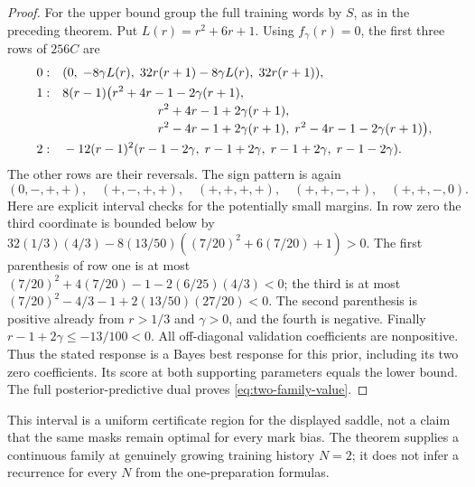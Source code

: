 \begin{proof}
For the upper bound group the full training words by $S$, as in the
preceding theorem. Put $L(r)=r^2+6r+1$. Using $f_\gamma(r)=0$, the first
three rows of $256C$ are
\begin{align*}
 0:&\quad (0,\;-8\gamma L(r),\;32r(r+1)-8\gamma L(r),\;32r(r+1)),\\
 1:&\quad 8(r-1)\bigl(r^2+4r-1-2\gamma(r+1),\bigr.\\[-2pt]
   &\hspace{30mm}r^2+4r-1+2\gamma(r+1),\\[-2pt]
   &\hspace{30mm}\bigl.r^2-4r-1+2\gamma(r+1),\;
                       r^2-4r-1-2\gamma(r+1)\bigr),\\
 2:&\quad-12(r-1)^2(r-1-2\gamma,\;r-1+2\gamma,\;
                                     r-1+2\gamma,\;r-1-2\gamma).
\end{align*}
The other rows are their reversals. The sign pattern is again
\[
 (0,-,+,+),\quad(+,-,+,+),\quad(+,+,+,+),\quad
 (+,+,-,+),\quad(+,+,-,0).
\]
Here are explicit interval checks for the potentially small margins.
In row zero the third coordinate is bounded below by
$32(1/3)(4/3)-8(13/50)((7/20)^2+6(7/20)+1)>0$.
The first parenthesis of row one is at most
$(7/20)^2+4(7/20)-1-2(6/25)(4/3)<0$; the third is at most
$(7/20)^2-4/3-1+2(13/50)(27/20)<0$.
The second parenthesis is positive already from $r>1/3$ and $\gamma>0$,
and the fourth is negative. Finally $r-1+2\gamma\le-13/100<0$.
All off-diagonal validation coefficients are nonpositive.
Thus the stated response is a Bayes best response for this prior,
including its two zero coefficients. Its score at both supporting
parameters equals the lower bound. The full posterior-predictive dual
proves \eqref{eq:two-family-value}.
\end{proof}

This interval is a uniform certificate region for the displayed saddle,
not a claim that the same masks remain optimal for every mark bias.
The theorem supplies a continuous family at genuinely growing training
history $N=2$; it does not infer a recurrence for every $N$ from the
one-preparation formulas.
